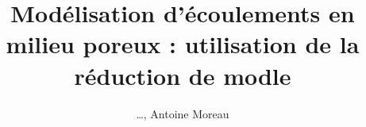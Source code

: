 \documentclass[a4paper,10pt]{article}
\title{Mod\'elisation d'\'ecoulements en milieu poreux : utilisation de la r\'eduction de mod\g{e}le}
\author{\dots , Antoine Moreau}
\begin{document}
\maketitle

\begin{abstract}

\end{abstract}

\section{}
\end{document}
